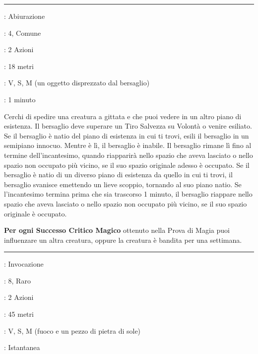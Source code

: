 \begin{multicols}{2}
\smallskip\noindent\rule{\linewidth}{2pt} \hypertarget{Esilio}{}\smallskip{}
\noindent
\begin{description}[noitemsep, topsep=0pt, parsep=0pt, partopsep=0pt, leftmargin=0cm, labelwidth=2.8cm]
	\item[\textbf{Lista di Magia}]: Abiurazione
	\item[\textbf{Livello}]: 4, Comune
	\item[\textbf{T. di Lancio}]: 2 Azioni
	\item[\textbf{Gittata}]: 18 metri
	\item[\textbf{Componenti}]: V, S, M (un oggetto disprezzato dal bersaglio)
	\item[\textbf{Durata}]: 1 minuto
\end{description}

Cerchi di spedire una creatura a gittata e che puoi vedere in un altro piano di esistenza. Il bersaglio deve superare un Tiro Salvezza su Volontà o venire esiliato. Se il bersaglio è natio del piano di esistenza in cui ti trovi, esili il bersaglio in un semipiano innocuo. Mentre è lì, il bersaglio è inabile. Il bersaglio rimane lì fino al termine dell'incantesimo, quando riapparirà nello spazio che aveva lasciato o nello spazio non occupato più vicino, se il suo spazio originale adesso è occupato. Se il bersaglio è natio di un diverso piano di esistenza da quello in cui ti trovi, il bersaglio svanisce emettendo un lieve scoppio, tornando al suo piano natio. Se l'incantesimo termina prima che sia trascorso 1 minuto, il bersaglio riappare nello spazio che aveva lasciato o nello spazio non occupato più vicino, se il suo spazio originale è occupato.

\textbf{Per ogni Successo Critico Magico} ottenuto nella Prova di Magia puoi influenzare un altra creatura, oppure la creatura è bandita per una settimana.

\smallskip\noindent\rule{\linewidth}{2pt} \hypertarget{Esplosione Solare}{}\smallskip{}
\noindent
\begin{description}[noitemsep, topsep=0pt, parsep=0pt, partopsep=0pt, leftmargin=0cm, labelwidth=2.8cm]
	\item[\textbf{Lista di Magia}]: Invocazione
	\item[\textbf{Livello}]: 8, Raro
	\item[\textbf{T. di Lancio}]: 2 Azioni
	\item[\textbf{Gittata}]: 45 metri
	\item[\textbf{Componenti}]: V, S, M (fuoco e un pezzo di pietra di sole)
	\item[\textbf{Durata}]: Istantanea
\end{description}


\end{multicols}
